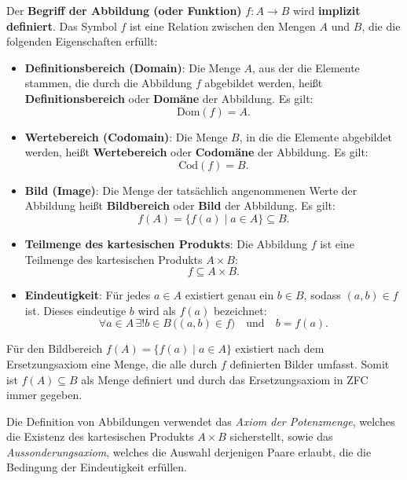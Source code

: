 \documentclass[main.tex]{subfiles}
\begin{document}
\begin{definition}[Abbildung]
    Der \textbf{Begriff der Abbildung (oder Funktion)} \( f: A \to B \) wird \textbf{implizit definiert}. Das Symbol \( f \) ist eine Relation zwischen den Mengen \( A \) und \( B \), die die folgenden Eigenschaften erfüllt:
    
    \begin{itemize}
        \item \textbf{Definitionsbereich (Domain)}: Die Menge \( A \), aus der die Elemente stammen, die durch die Abbildung \( f \) abgebildet werden, heißt \textbf{Definitionsbereich} oder \textbf{Domäne} der Abbildung. Es gilt:
        \[
        \text{Dom}(f) = A.
        \]
        
        \item \textbf{Wertebereich (Codomain)}: Die Menge \( B \), in die die Elemente abgebildet werden, heißt \textbf{Wertebereich} oder \textbf{Codomäne} der Abbildung. Es gilt:
        \[
        \text{Cod}(f) = B.
        \]
        
        \item \textbf{Bild (Image)}: Die Menge der tatsächlich angenommenen Werte der Abbildung heißt \textbf{Bildbereich} oder \textbf{Bild} der Abbildung. Es gilt:
        \[
        f(A) = \{ f(a) \mid a \in A \} \subseteq B.
        \]
        
        \item \textbf{Teilmenge des kartesischen Produkts}: Die Abbildung \( f \) ist eine Teilmenge des kartesischen Produkts \( A \times B \):
        \[
        f \subseteq A \times B.
        \]
        
        \item \textbf{Eindeutigkeit}: Für jedes \( a \in A \) existiert genau ein \( b \in B \), sodass \( (a, b) \in f \) ist. Dieses eindeutige \( b \) wird als \( f(a) \) bezeichnet:
        \[
        \forall a \in A \, \exists! b \in B \, \big( (a, b) \in f \big) \quad \text{und} \quad b = f(a).
        \]
    \end{itemize}
\end{definition}
\begin{remark}
     Für den Bildbereich \( f(A) = \{ f(a) \mid a \in A \} \) existiert nach dem Ersetzungsaxiom eine Menge, die alle durch \( f \) definierten Bilder umfasst. Somit ist \( f(A) \subseteq B \) als Menge definiert und durch das Ersetzungsaxiom in ZFC immer gegeben.
\end{remark}

Die Definition von Abbildungen verwendet das \textit{Axiom der Potenzmenge}, welches die Existenz des kartesischen Produkts \( A \times B \) sicherstellt, sowie das \textit{Aussonderungsaxiom}, welches die Auswahl derjenigen Paare erlaubt, die die Bedingung der Eindeutigkeit erfüllen.
\end{document}
